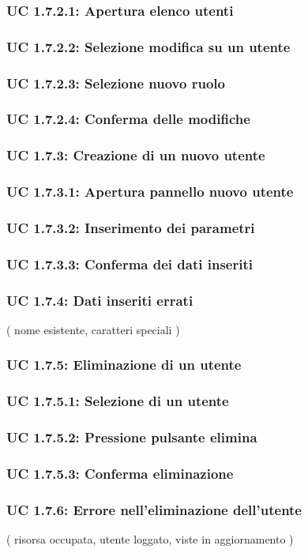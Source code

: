 \subsubsection{UC 1.7.2.1: Apertura elenco utenti}
\subsubsection{UC 1.7.2.2: Selezione modifica su un utente}
\subsubsection{UC 1.7.2.3: Selezione nuovo ruolo}
\subsubsection{UC 1.7.2.4: Conferma delle modifiche}
\subsubsection{UC 1.7.3: Creazione di un nuovo utente}
\subsubsection{UC 1.7.3.1: Apertura pannello nuovo utente}
\subsubsection{UC 1.7.3.2: Inserimento dei parametri}
\subsubsection{UC 1.7.3.3: Conferma dei dati inseriti}
\subsubsection{UC 1.7.4: Dati inseriti errati}
( nome esistente, caratteri speciali )
\subsubsection{UC 1.7.5: Eliminazione di un utente}
\subsubsection{UC 1.7.5.1: Selezione di un utente}
\subsubsection{UC 1.7.5.2: Pressione pulsante elimina}
\subsubsection{UC 1.7.5.3: Conferma eliminazione}
\subsubsection{UC 1.7.6: Errore nell’eliminazione dell'utente}
( risorsa occupata, utente loggato, viste in aggiornamento )





